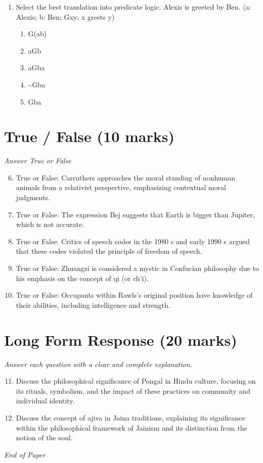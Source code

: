 \documentclass[12pt]{article}
\begin{document}
\begin{enumerate}[label=\arabic*.]
\begin{enumerate}[label=(\alph*)]
    \item both a and c.
    \item neither operation nor pleasure exist for their own sake.
\end{enumerate}
\item Select the best translation into predicate logic. Alexis is greeted by Ben. (a: Alexis; b: Ben; Gxy: x greets y)
\begin{enumerate}[label=(\alph*)]
    \item G(ab)
    \item aGb
    \item aGba
    \item \textasciitilde{}Gba
    \item Gba
\end{enumerate}
\end{enumerate}

\section*{True / False (10 marks)}
\textit{Answer True or False}
\begin{enumerate}[label=\arabic*.]
\setcounter{enumi}{5}
\item True or False: Carruthers approaches the moral standing of nonhuman animals from a relativist perspective, emphasizing contextual moral judgments.
\item True or False: The expression Bej suggests that Earth is bigger than Jupiter, which is not accurate.
\item True or False: Critics of speech codes in the 1980 s and early 1990 s argued that these codes violated the principle of freedom of speech.
\item True or False: Zhuangzi is considered a mystic in Confucian philosophy due to his emphasis on the concept of qi (or ch'i).
\item True or False: Occupants within Rawls's original position have knowledge of their abilities, including intelligence and strength.
\end{enumerate}

\section*{Long Form Response (20 marks)}
\textit{Answer each question with a clear and complete explanation.}
\begin{enumerate}[label=\arabic*.]
\setcounter{enumi}{10}
\item Discuss the philosophical significance of Pongal in Hindu culture, focusing on its rituals, symbolism, and the impact of these practices on community and individual identity.
\item Discuss the concept of ajiva in Jaina traditions, explaining its significance within the philosophical framework of Jainism and its distinction from the notion of the soul.
\end{enumerate}

\vfill
\noindent\textit{End of Paper}
\end{document}
